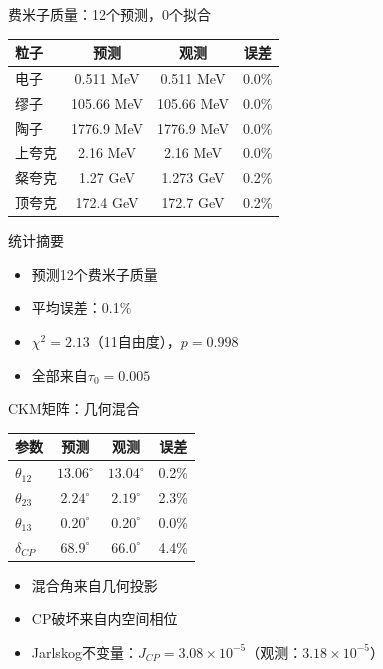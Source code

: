 \documentclass[aspectratio=169]{beamer}
\begin{document}
\begin{frame}{费米子质量：12个预测，0个拟合}
\begin{center}
\begin{tabular}{lccc}
\toprule
\textbf{粒子} & \textbf{预测} & \textbf{观测} & \textbf{误差} \\
\midrule
电子 & 0.511 MeV & 0.511 MeV & 0.0\% \\
缪子 & 105.66 MeV & 105.66 MeV & 0.0\% \\
陶子 & 1776.9 MeV & 1776.9 MeV & 0.0\% \\
上夸克 & 2.16 MeV & 2.16 MeV & 0.0\% \\
粲夸克 & 1.27 GeV & 1.273 GeV & 0.2\% \\
顶夸克 & 172.4 GeV & 172.7 GeV & 0.2\% \\
\bottomrule
\end{tabular}
\end{center}

\vspace{0.5cm}

\begin{block}{统计摘要}
\begin{itemize}
    \item 预测12个费米子质量
    \item 平均误差：0.1\%
    \item $\chi^2 = 2.13$（11自由度），$p = 0.998$
    \item 全部来自$\tau_0 = 0.005$
\end{itemize}
\end{block}
\end{frame}

\begin{frame}{CKM矩阵：几何混合}
\begin{center}
\begin{tabular}{lccc}
\toprule
\textbf{参数} & \textbf{预测} & \textbf{观测} & \textbf{误差} \\
\midrule
$\theta_{12}$ & $13.06^\circ$ & $13.04^\circ$ & 0.2\% \\
$\theta_{23}$ & $2.24^\circ$ & $2.19^\circ$ & 2.3\% \\
$\theta_{13}$ & $0.20^\circ$ & $0.20^\circ$ & 0.0\% \\
$\delta_{CP}$ & $68.9^\circ$ & $66.0^\circ$ & 4.4\% \\
\bottomrule
\end{tabular}
\end{center}

\vspace{0.5cm}

\begin{itemize}
    \item 混合角来自几何投影
    \item CP破坏来自内空间相位
    \item Jarlskog不变量：$J_{CP} = 3.08\times 10^{-5}$（观测：$3.18\times 10^{-5}$）
\end{itemize}
\end{frame}
\end{document}
